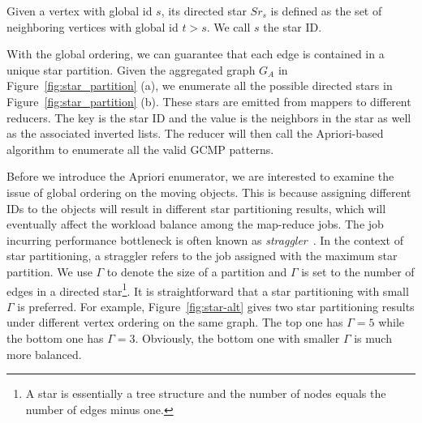 \begin{definition}
Given a vertex with global id $s$, its directed star $Sr_s$ is defined as the set of neighboring vertices with global id $t>s$. We call $s$ the star ID.
\end{definition}

With the global ordering, we can guarantee that each edge is contained in a unique star partition. Given the aggregated graph $G_A$  in Figure~\ref{fig:star_partition} (a), we enumerate all the possible directed stars in Figure~\ref{fig:star_partition} (b). These stars are emitted from mappers to different reducers. The key is the star ID and the value is the neighbors in the star as well as the associated inverted lists. 
The reducer will then call the Apriori-based algorithm to enumerate all the valid GCMP patterns.


Before we introduce the Apriori enumerator, we are interested to 
examine the issue of global ordering on the moving objects.
This is because assigning different IDs to the objects will result in 
different star partitioning results, which will eventually affect the workload 
balance among the map-reduce jobs. The job incurring performance bottleneck is often known as \emph{straggler}~\cite{kwon2012skewtune,xin2013shark,coppa2015data}. In the context of star partitioning, a straggler refers to the job assigned with the maximum star partition. We use $\Gamma$ to denote the size of a partition and $\Gamma$ is set to the number of edges in a directed star\footnote{A star is essentially a tree structure and the number of nodes equals the number of edges minus one.}. It is straightforward that a star partitioning with small $\Gamma$ is preferred. For example, Figure~\ref{fig:star-alt} gives two star partitioning results under 
different vertex ordering on the same graph. The top one has $\Gamma = 5$ while the bottom one has $\Gamma = 3$. Obviously, the bottom one with smaller $\Gamma$ is much more balanced.



